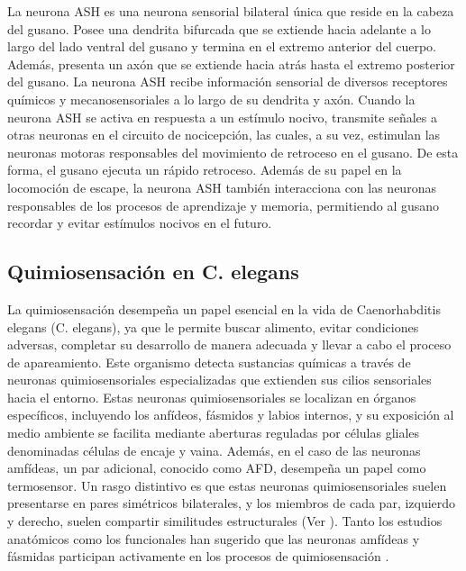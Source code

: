La neurona ASH es una neurona sensorial bilateral única que reside en la cabeza del gusano. Posee una dendrita bifurcada que se extiende hacia adelante a lo largo del lado ventral del gusano y termina en el extremo anterior del cuerpo. Además, presenta un axón que se extiende hacia atrás hasta el extremo posterior del gusano. La neurona ASH recibe información sensorial de diversos receptores químicos y mecanosensoriales a lo largo de su dendrita y axón. Cuando la neurona ASH se activa en respuesta a un estímulo nocivo, transmite señales a otras neuronas en el circuito de nocicepción, las cuales, a su vez, estimulan las neuronas motoras responsables del movimiento de retroceso en el gusano. De esta forma, el gusano ejecuta un rápido retroceso. Además de su papel en la locomoción de escape, la neurona ASH también interacciona con las neuronas responsables de los procesos de aprendizaje y memoria, permitiendo al gusano recordar y evitar estímulos nocivos en el futuro.



\subsection{Quimiosensación en C. elegans}\label{sec:quimiosensacion}

La quimiosensación desempeña un papel esencial en la vida de Caenorhabditis elegans (C. elegans), ya que le permite buscar alimento, evitar condiciones adversas, completar su desarrollo de manera adecuada y llevar a cabo el proceso de apareamiento. Este organismo detecta sustancias químicas a través de neuronas quimiosensoriales especializadas que extienden sus cilios sensoriales hacia el entorno. Estas neuronas quimiosensoriales se localizan en órganos específicos, incluyendo los anfídeos, fásmidos y labios internos, y su exposición al medio ambiente se facilita mediante aberturas reguladas por células gliales denominadas células de encaje y vaina. Además, en el caso de las neuronas amfídeas, un par adicional, conocido como AFD, desempeña un papel como termosensor. Un rasgo distintivo es que estas neuronas quimiosensoriales suelen presentarse en pares simétricos bilaterales, y los miembros de cada par, izquierdo y derecho, suelen compartir similitudes estructurales (Ver ). Tanto los estudios anatómicos como los funcionales han sugerido que las neuronas amfídeas y fásmidas participan activamente en los procesos de quimiosensación \cite{bargmann_chemosensation_2006}.


